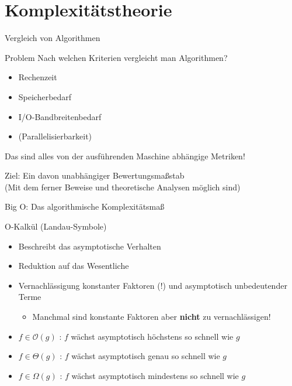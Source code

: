\section{Komplexitätstheorie}

\begin{frame}{Vergleich von Algorithmen}
	\begin{block}{Problem}
		Nach welchen Kriterien vergleicht man Algorithmen?
	\end{block}

	\pause

	\begin{itemize}
		\item Rechenzeit
		\item Speicherbedarf
		\item I/O-Bandbreitenbedarf
		\item (Parallelisierbarkeit)
	\end{itemize}

	\pause
	
	Das sind alles von der ausführenden Maschine abhängige Metriken!
	
	Ziel: Ein davon unabhängiger Bewertungsmaßstab \\
	\footnotesize{(Mit dem ferner Beweise und theoretische Analysen möglich sind)}
\end{frame}

\begin{frame}{Big O: Das algorithmische Komplexitätsmaß}
	\begin{block}{O-Kalkül (Landau-Symbole)}
		\begin{itemize}
			\item Beschreibt das asymptotische Verhalten 
			\item Reduktion auf das Wesentliche
			\item Vernachlässigung konstanter Faktoren (!) und asymptotisch unbedeutender Terme
			\begin{itemize}
				\item Manchmal sind konstante Faktoren aber \textbf{nicht} zu vernachlässigen!
			\end{itemize}
		\end{itemize}
		
		\pause
		
		\begin{itemize}
			\item $f \in \mathcal{O}(g)$ : $f$ wächst asymptotisch höchstens so schnell wie $g$
			\item $f \in \Theta(g)$ : $f$ wächst asymptotisch genau so schnell wie $g$
			\item $f \in \Omega(g)$ : $f$ wächst asymptotisch mindestens so schnell wie $g$
		\end{itemize}
	\end{block}
\end{frame}

